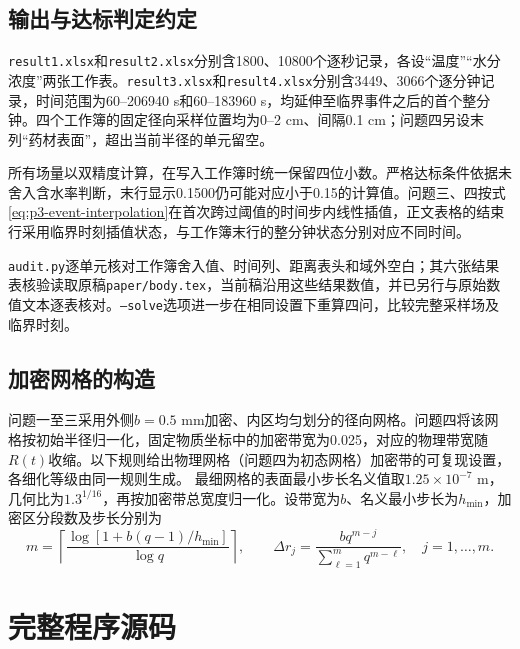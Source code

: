 \begin{appendices}
\subsection{输出与达标判定约定}
\texttt{result1.xlsx}和\texttt{result2.xlsx}分别含1800、10800个逐秒记录，各设“温度”“水分浓度”两张工作表。\texttt{result3.xlsx}和\texttt{result4.xlsx}分别含3449、3066个逐分钟记录，时间范围为60--206940 s和60--183960 s，均延伸至临界事件之后的首个整分钟。四个工作簿的固定径向采样位置均为0--2 cm、间隔0.1 cm；问题四另设末列“药材表面”，超出当前半径的单元留空。

所有场量以双精度计算，在写入工作簿时统一保留四位小数。严格达标条件依据未舍入含水率判断，末行显示0.1500仍可能对应小于0.15的计算值。问题三、四按式\eqref{eq:p3-event-interpolation}在首次跨过阈值的时间步内线性插值，正文表格的结束行采用临界时刻插值状态，与工作簿末行的整分钟状态分别对应不同时间。

\texttt{audit.py}逐单元核对工作簿舍入值、时间列、距离表头和域外空白；其六张结果表核验读取原稿\texttt{paper/body.tex}，当前稿沿用这些结果数值，并已另行与原始数值文本逐表核对。\texttt{--solve}选项进一步在相同设置下重算四问，比较完整采样场及临界时刻。

\subsection{加密网格的构造}
问题一至三采用外侧$b=0.5$ mm加密、内区均匀划分的径向网格。问题四将该网格按初始半径归一化，固定物质坐标中的加密带宽为0.025，对应的物理带宽随$R(t)$收缩。以下规则给出物理网格（问题四为初态网格）加密带的可复现设置，各细化等级由同一规则生成。
最细网格的表面最小步长名义值取$1.25\times10^{-7}$ m，几何比为$1.3^{1/16}$，再按加密带总宽度归一化。设带宽为$b$、名义最小步长为$h_{\min}$，加密区分段数及步长分别为
\begin{equation}
\label{eq:appendix-grid}
m=\left\lceil\frac{\log[1+b(q-1)/h_{\min}]}{\log q}\right\rceil,
\qquad \Delta r_j=\frac{bq^{m-j}}{\sum_{\ell=1}^m q^{m-\ell}},\quad j=1,\ldots,m.
\end{equation}

\clearpage
\section{完整程序源码}
\label{sec:appendix-code}
\begingroup
{}

\end{appendices}
